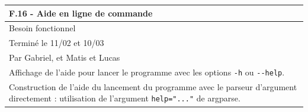 \documentclass[a4paper,12pt]{article}
\begin{document}
\vspace{1cm}

\noindent
\setlength{\arrayrulewidth}{1.5pt}
\renewcommand{\arraystretch}{1.5}
\begin{tabularx}{\textwidth}{|X|}
    \hline
    \textbf{F.16 - Aide en ligne de commande}                                                                                                            \\
    \hline
    Besoin fonctionnel                                                                                                                                   \\
    \hline
    Terminé le 11/02 et 10/03                                                                                                                            \\
    Par Gabriel, et Matis et Lucas                                                                                                                       \\
    \hline
    Affichage de l’aide pour lancer le programme avec les options \texttt{-h} ou \texttt{-}\texttt{-help}.                                               \\
    Construction de l’aide du lancement du programme avec le parseur d’argument directement : utilisation de l’argument \texttt{help="..."} de argparse. \\


\end{tabularx}
\end{document}
